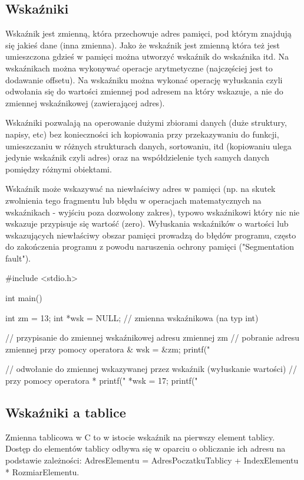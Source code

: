 \documentclass{pdfBooklets}
\begin{document}
\subsection{Wskaźniki}
Wskaźnik jest zmienną, która przechowuje adres pamięci, pod którym znajdują się jakieś dane (inna zmienna). Jako że wskaźnik jest zmienną która też jest umieszczona gdzieś w pamięci można utworzyć wskaźnik do wskaźnika itd. Na wskaźnikach można wykonywać operacje arytmetyczne (najczęściej jest to dodawanie offsetu). Na wskaźniku można wykonać operację wyłuskania czyli odwołania się do wartości zmiennej pod adresem na który wskazuje, a nie do zmiennej wskaźnikowej (zawierającej adres).

Wskaźniki pozwalają na operowanie dużymi zbiorami danych (duże struktury, napisy, etc) bez konieczności ich kopiowania przy przekazywaniu do funkcji, umieszczaniu w różnych strukturach danych, sortowaniu, itd (kopiowaniu ulega jedynie wskaźnik czyli adres) oraz na współdzielenie tych samych danych pomiędzy różnymi obiektami.

Wskaźnik może wskazywać na niewłaściwy adres w pamięci (np. na skutek zwolnienia tego fragmentu lub błędu w operacjach matematycznych na wskaźnikach - wyjściu poza dozwolony zakres), typowo wskaźnikowi który nic nie wskazuje przypisuje się wartość  (zero). Wyłuskania wskaźników o wartości  lub wskazujących niewłaściwy obszar pamięci prowadzą do błędów programu, często do zakończenia programu z powodu naruszenia ochrony pamięci ("Segmentation fault"). 

\begin{CodeFrame*}[c]{}
#include <stdio.h>

int main() {
  int zm = 13;
  int *wsk = NULL; // zmienna wskaźnikowa (na typ int)
  
  // przypisanie do zmiennej wskaźnikowej adresu zmiennej zm
  // pobranie adresu zmiennej przy pomocy operatora &
  wsk = &zm;
  printf("%
  
  // odwołanie do zmiennej wskazywanej przez wskaźnik (wyłuskanie wartości)
  // przy pomocy operatora *
  printf("%
  *wsk = 17;
  printf("%
}
\end{CodeFrame*}

\subsection{Wskaźniki a tablice}

Zmienna tablicowa w C to w istocie wskaźnik na pierwszy element tablicy.
Dostęp do elementów tablicy odbywa się w oparciu o obliczanie ich adresu na podstawie zależności: AdresElementu = AdresPoczatkuTablicy + IndexElementu * RozmiarElementu.
\end{document}
